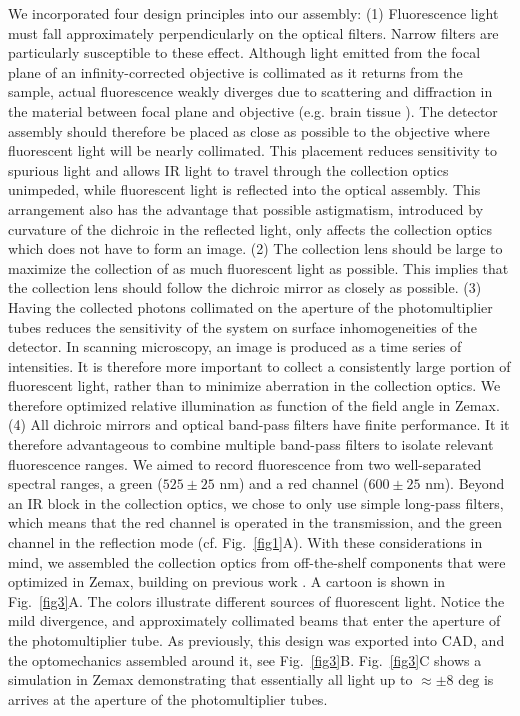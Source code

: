 \documentclass[10pt,letterpaper]{article}
\begin{document}
%
We incorporated four design principles into our assembly: (1) Fluorescence light must fall approximately perpendicularly on the optical filters. Narrow filters are particularly susceptible to these effect. Although light emitted from the focal plane of an infinity-corrected objective is collimated as it returns from the sample, actual fluorescence weakly diverges due to scattering and diffraction in the material between focal plane and objective (e.g. brain tissue \cite{Zipfel2003, Taddeucci1996}). The detector assembly should therefore be placed as close as possible to the objective where fluorescent light will be nearly collimated. This placement reduces sensitivity to spurious light and allows IR light to travel through the collection optics unimpeded, while fluorescent light is reflected into the optical assembly. This arrangement also has the advantage that possible astigmatism, introduced by curvature of the dichroic in the reflected light, only affects the collection optics which does not have to form an image. (2) The collection lens should be large to maximize the collection of as much fluorescent light as possible. This implies that the collection lens should follow the dichroic mirror as closely as possible. (3) Having the collected photons collimated on the aperture of the photomultiplier tubes reduces the sensitivity of the system on surface inhomogeneities of the detector\cite{Tsai2002, Young2015}. In scanning microscopy, an image is produced as a time series of intensities. It is therefore more important to collect a consistently large portion of fluorescent light, rather than to minimize aberration in the collection optics. We therefore optimized relative illumination as function of the field angle in Zemax. (4) All dichroic mirrors and optical band-pass filters have finite performance. It it therefore advantageous to combine multiple band-pass filters to isolate relevant fluorescence ranges. We aimed to record fluorescence from two well-separated spectral ranges, a green ($525\pm25\text{ nm}$) and a red channel ($600\pm25\text{ nm}$). Beyond an IR block in the collection optics, we chose to only use simple long-pass filters, which means that the red channel is operated in the transmission, and the green channel in the reflection mode (cf. Fig.~\ref{fig1}A).\newline
With these considerations in mind, we assembled the collection optics from off-the-shelf components that were optimized in Zemax, building on previous work \cite{Tsai2002,Tsai2015}. A cartoon is shown in Fig.~\ref{fig3}A. The colors illustrate different sources of fluorescent light. Notice the mild divergence, and approximately collimated beams that enter the aperture of the photomultiplier tube. As previously, this design was exported into CAD, and the optomechanics assembled around it, see Fig.~\ref{fig3}B. Fig.~\ref{fig3}C shows a simulation in Zemax demonstrating that essentially all light up to $\approx\pm 8\text{ deg}$ is arrives at the aperture of the photomultiplier tubes.
\end{document}
